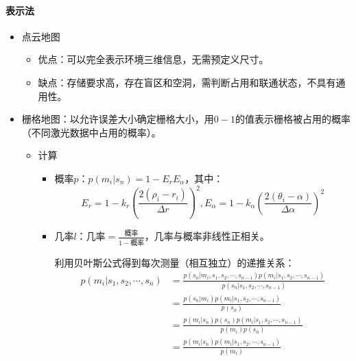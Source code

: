 \documentclass[
12pt, %
a4paper, 
oneside, %
headinclude,footinclude, %
]{scrartcl}
\begin{document}
\paragraph{表示法}
\begin{itemize}
\item 点云地图
\begin{itemize}
\item 优点：可以完全表示环境三维信息，无需预定义尺寸。
\item 缺点：存储要求高，存在盲区和空洞，需判断占用和联通状态，不具有通用性。
\end{itemize}
\item 栅格地图：以允许误差大小确定栅格大小，用$ 0 - 1 $的值表示栅格被占用的概率（不同激光数据中占用的概率）。
\begin{itemize}
\item 计算
\begin{itemize}
\item 概率$ p $：$ p(m_i|s_n) = 1 - E_r E_\alpha $，其中：
$$ E_r = 1 - k_r(\frac{2(\rho_i - r_i)}{\Delta r})^2, E_\alpha = 1 - k_\alpha(\frac{2(\theta_i - \alpha)}{\Delta \alpha})^2 $$
\item 几率$ l $：$ \text{几率} = \frac{\text{概率}}{1 - \text{概率}} $，几率与概率非线性正相关。

利用贝叶斯公式得到每次测量（相互独立）的递推关系：
\begin{align*}
p(m_i|s_1, s_2, \cdots, s_n)
& = \frac{p(s_n|m_i, s_1, s_2, \cdots, s_{n - 1})p(m_i|s_1, s_2, \cdots, s_{n - 1})}{p(s_n|s_1, s_2, \cdots, s_{n - 1})} \\
&= \frac{p(s_n|m_i)p(m_i|s_1, s_2, \cdots, s_{n - 1})}{p(s_n)} \\
&= \frac{p(m_i|s_n)p(s_n)p(m_i|s_1, s_2, \cdots, s_{n - 1})}{p(m_i)p(s_n)} \\
&= \frac{p(m_i|s_n)p(m_i|s_1, s_2, \cdots, s_{n - 1})}{p(m_i)}
\end{align*}


\end{itemize}
\end{itemize}
\end{itemize}
\end{document}
